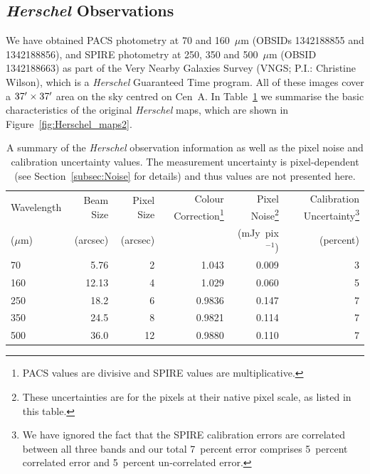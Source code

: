 \subsection{\emph{Herschel} Observations}\label{subsec:Herschel}
We have obtained PACS photometry at 70 and 160~$\mu$m (OBSIDs 1342188855 and 1342188856), and SPIRE pho\-tometry at 250, 350 and 500~$\mu$m (OBS\-ID 1342188663) as part of the Very Nearby Galaxies Survey (VNGS; P.I.: Christine Wilson), which is a \emph{Herschel} Guaranteed Time program.  All of these images cover a $37\mbox{$^\prime$} \times 37\mbox{$^\prime$}$ area on the sky centred on Cen~A.  In Table~\ref{tbl:herschel_char2} we summarise the basic characteristics of the original \emph{Herschel} maps, which are shown in Figure~\ref{fig:Herschel_maps2}.

\begin{landscape}
\begin{table}
\begin{minipage}{\columnwidth}
 \centering
 \caption[Observational details of \emph{Herschel} photometry of Centaurus~A]{A summary of the \emph{Herschel} observation information as well as the pixel noise and calibration uncertainty values.  The measurement uncertainty is pixel-dependent (see Section~\ref{subsec:Noise} for details) and thus values are not presented here.}
 \label{tbl:herschel_char2}
 \begin{tabular}{@{}lrrrrr@{}}
  \hline
  Wavelength & Beam Size & Pixel Size & Colour Correction\footnote{PACS values are divisive and SPIRE values are multiplicative.}  & Pixel Noise\footnote{These uncertainties are for the pixels at their native pixel scale, as listed in this table.}  & Calibration Uncertainty\footnote{We have ignored the fact that the SPIRE calibration errors are correlated between all three bands and our total 7~percent error comprises 5~percent correlated error and 5~percent un-correlated error.} \\
  ($\mu$m)   & (arcsec)  & (arcsec)   &                   & (mJy~pix$^{-1}$)  & (percent)       \\
  \hline
  70         & 5.76      & 2          & 1.043             & 0.009           & 3         \\
  160        & 12.13     & 4          & 1.029             & 0.060           & 5      \\
  250        & 18.2      & 6          & 0.9836            & 0.147           & 7  \\
  350        & 24.5      & 8          & 0.9821            & 0.114           & 7 \\
  500        & 36.0      & 12         & 0.9880            & 0.110           & 7 \\
  \hline
 \end{tabular}
\end{minipage}
\end{table}
\end{landscape}

